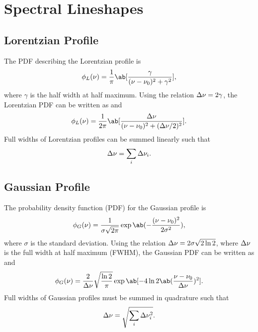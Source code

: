\chapter{Spectral Lineshapes}
\label{c:spectral_lineshapes}

\section{Lorentzian Profile}
\label{s:lorentzian_profile}

The PDF describing the Lorentzian profile is
\begin{equation*}
    \phi_L(\nu) = \frac{1}{\pi}\ab[\frac{\gamma}{(\nu - \nu_0)^2 + \gamma^2}],
\end{equation*}
where $\gamma$ is the half width at half maximum.
Using the relation $\adif{\nu} = 2\gamma$, the Lorentzian PDF can be written as \cite[52]{foxStudentsGuideAtomic2018} and \cite[133]{hansonSpectroscopyOpticalDiagnostics2016}
\begin{equation*}
    \phi_L(\nu) = \frac{1}{2\pi}\ab[\frac{\adif{\nu}}{(\nu - \nu_0)^2 + (\adif{\nu}/2)^2}].
\end{equation*}
Full widths of Lorentzian profiles can be summed linearly such that \cite[361]{josyulaHypersonicNonequilibriumFlows2015}
\begin{equation*}
    \adif{\nu} = \sum_i \adif{\nu}_i.
\end{equation*}

\section{Gaussian Profile}
\label{s:gaussian_profile}

The probability density function (PDF) for the Gaussian profile is
\begin{equation*}
    \phi_G(\nu) = \frac{1}{\sigma\sqrt{2\pi}}\exp\ab(-\frac{(\nu - \nu_0)^2}{2\sigma^2}),
\end{equation*}
where $\sigma$ is the standard deviation.
Using the relation $\adif{\nu} = 2\sigma\sqrt{2\ln{2}}$, where $\adif{\nu}$ is the full width at half maximum (FWHM), the Gaussian PDF can be written as \cite[55]{foxStudentsGuideAtomic2018} and \cite[138]{hansonSpectroscopyOpticalDiagnostics2016}
\begin{equation*}
    \phi_G(\nu) = \frac{2}{\adif{\nu}}\sqrt{\frac{\ln{2}}{\pi}}\exp\ab[-4\ln{2}\ab(\frac{\nu - \nu_0}{\adif{\nu}})^2].
\end{equation*}
Full widths of Gaussian profiles must be summed in quadrature such that \cite[361]{josyulaHypersonicNonequilibriumFlows2015}
\begin{equation*}
    \adif{\nu} = \sqrt{\sum_i \adif{\nu}_i^2}.
\end{equation*}

